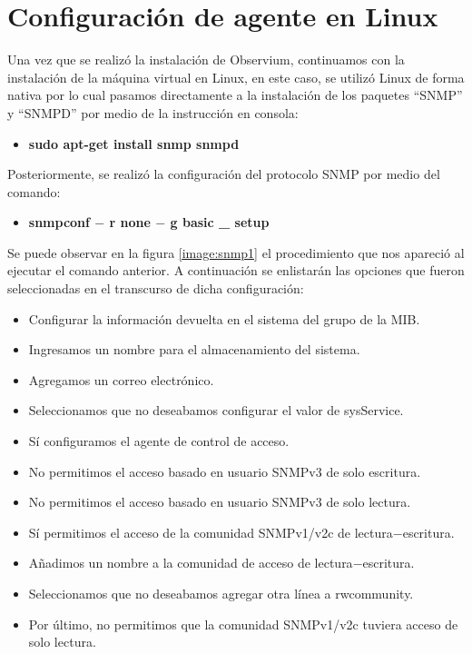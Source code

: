 \section{Configuración de agente en Linux}
Una vez que se realizó la instalación de Observium, continuamos con la instalación de la máquina virtual en Linux, en este caso, se utilizó Linux de forma nativa por lo cual pasamos directamente a la instalación de los paquetes ``SNMP'' y ``SNMPD'' por medio de la instrucción en consola:
\begin{itemize}
\item \textbf{sudo apt-get install snmp snmpd}
\end{itemize}
Posteriormente, se realizó la configuración del protocolo SNMP por medio del comando:
\begin{itemize}
\item \textbf{snmpconf $-$ r none $-$ g basic \_ setup}
\end{itemize}
Se puede observar en la figura \ref{image:snmp1} el procedimiento que nos apareció al ejecutar el comando anterior. A continuación se enlistarán las opciones que fueron seleccionadas en el transcurso de dicha configuración:
\begin{itemize}
\item Configurar la información devuelta en el sistema del grupo de la MIB.
\item Ingresamos un nombre para el almacenamiento del sistema.
\item Agregamos un correo electrónico.
\item Seleccionamos que no deseabamos configurar el valor de sysService.
\item Sí configuramos el agente de control de acceso.
\item No permitimos el acceso basado en usuario SNMPv3 de solo escritura.
\item No permitimos el acceso basado en usuario SNMPv3 de solo lectura.
\item Sí permitimos el acceso de la comunidad SNMPv1/v2c de lectura$-$escritura.
\item Añadimos un nombre a la comunidad de acceso de lectura$-$escritura.
\item Seleccionamos que no deseabamos agregar otra línea a rwcommunity.
\item Por último, no permitimos que la comunidad SNMPv1/v2c tuviera acceso de solo lectura.
\end{itemize}
\FloatBarrier
